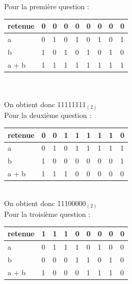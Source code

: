 \begin{Exercice}[15 minutes]
\begin{solution}
        Pour la première question :
        \\
    \begin{tabular}{| p{1cm} | p{1cm} | p{1cm} | p{1cm} | p{1cm} | p{1cm} | p{1cm} | p{1cm} | p{1cm} |} 
        \hline
    retenue & 0 & 0 & 0 & 0 & 0 & 0 & 0 & 0 \\ [0.5ex]
    \hline
        a & 0 & 1 & 0 & 1 & 0 & 1 & 0 & 1 \\ [0.5ex] 
        \hline
        b & 1 & 0 & 1 & 0 & 1 & 0 & 1 & 0 \\ [0.5ex] 
        \hline
        a + b & 1 & 1 & 1 & 1 & 1 & 1 & 1 & 1 \\ [0.5ex]
        \hline
    \end{tabular}\\ \\
    On obtient donc 11111111$_{(2)}$\\
        Pour la deuxième question : \\
        \begin{tabular}{| p{1cm} | p{1cm} | p{1cm} | p{1cm} | p{1cm} | p{1cm} | p{1cm} | p{1cm} | p{1cm} |} 
            \hline
	    retenue & 0 & 0 & 1 & 1 & 1 & 1 & 1 & 0 \\ [0.5ex]
	    \hline
            a & 0 & 1 & 0 & 1 & 1 & 1 & 1 & 1 \\ [0.5ex] 
            \hline
            b & 1 & 0 & 0 & 0 & 0 & 0 & 0 & 1 \\ [0.5ex] 
            \hline
            a + b & 1 & 1 & 1 & 0 & 0 & 0 & 0 & 0 \\ [0.5ex]
            \hline
        \end{tabular} \\

        On obtient donc 11100000$_{(2)}$ \\

        Pour la troisième question : \\
        \begin{tabular}{| p{1cm} | p{1cm} | p{1cm} | p{1cm} | p{1cm} | p{1cm} | p{1cm} | p{1cm} | p{1cm} |} 
            \hline
	    retenue & 1 & 1 & 1 & 0 & 0 & 0 & 0 & 0 \\ [0.5ex]
	    \hline
            a & 0 & 1 & 1 & 1 & 0 & 1 & 0 & 0 \\ [0.5ex] 
            \hline
            b & 0 & 0 & 0 & 1 & 1 & 0 & 1 & 0 \\ [0.5ex] 
            \hline
            a + b & 1 & 0 & 0 & 0 & 1 & 1 & 1 & 0 \\ [0.5ex]
            \hline
        \end{tabular} \\


\end{solution}
\end{Exercice}
